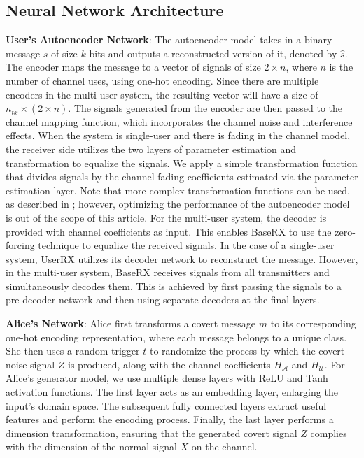 \subsection{Neural Network Architecture}
\textbf{User's Autoencoder Network}: The autoencoder model takes in a binary message \(s\) of size \(k\) bits and outputs a reconstructed version of it, denoted by \(\hat{s}\). The encoder maps the message to a vector of signals of size \(2 \times n\), where \(n\) is the number of channel uses, using one-hot encoding. Since there are multiple encoders in the multi-user system, the resulting vector will have a size of \(n_{tx} \times (2 \times n)\). The signals generated from the encoder are then passed to the channel mapping function, which incorporates the channel noise and interference effects. When the system is single-user and there is fading in the channel model, the receiver side utilizes the two layers of parameter estimation and transformation to equalize the signals. We apply a simple transformation function that divides signals by the channel fading coefficients estimated via the parameter estimation layer. Note that more complex transformation functions can be used, as described in \cite{o2017introduction}; however, optimizing the performance of the autoencoder model is out of the scope of this article. For the multi-user system, the decoder is provided with channel coefficients as input. This enables BaseRX to use the zero-forcing technique \cite{garg2010wireless} to equalize the received signals. In the case of a single-user system, UserRX utilizes its decoder network to reconstruct the message. However, in the multi-user system, BaseRX receives signals from all transmitters and simultaneously decodes them. This is achieved by first passing the signals to a pre-decoder network and then using separate decoders at the final layers.


\textbf{Alice's Network}: Alice first transforms a covert message \(m\) to its corresponding one-hot encoding representation, where each message belongs to a unique class. She then uses a random trigger \(t\) to randomize the process by which the covert noise signal \(Z\) is produced, along with the channel coefficients \(H_{\mathcal{A}}\) and \(H_{\mathcal{U}}\). For Alice's generator model, we use multiple dense layers with ReLU and Tanh activation functions. The first layer acts as an embedding layer, enlarging the input's domain space. The subsequent fully connected layers extract useful features and perform the encoding process. Finally, the last layer performs a dimension transformation, ensuring that the generated covert signal \(Z\) complies with the dimension of the normal signal \(X\) on the channel. 


